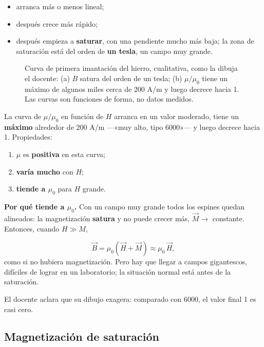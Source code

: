 \documentclass[12pt,a4paper]{article}
\begin{document}
\begin{itemize}
  \item arranca más o menos lineal;
  \item después crece más rápido;
  \item después empieza a \textbf{saturar}, con una pendiente mucho más baja; la zona de
  saturación está del orden de \textbf{un tesla}, un campo muy grande.
\end{itemize}

\begin{figure}[H]
  \centering
  
  \caption{Curva de primera imantación del hierro, cualitativa, como la dibuja el docente: (a) $B$ satura del orden de un tesla; (b) $\mu/\mu_0$ tiene un máximo de algunos miles cerca de 200 A/m y luego decrece hacia 1. Las curvas son funciones de forma, no datos medidos.}
\end{figure}

La curva de $\mu/\mu_0$ en función de $H$ arranca en un valor moderado, tiene un
\textbf{máximo} alrededor de 200 A/m ---«muy alto, tipo 6000»--- y luego decrece hacia
1. Propiedades:

\begin{enumerate}
  \item $\mu$ es \textbf{positiva} en esta curva;
  \item \textbf{varía mucho} con $H$;
  \item \textbf{tiende a $\mu_0$} para $H$ grande.
\end{enumerate}

\textbf{Por qué tiende a $\mu_0$.} Con un campo muy grande todos los espines quedan
alineados: la magnetización \textbf{satura} y no puede crecer más, $\vec M\to$
constante. Entonces, cuando $H\gg M$,

\[
\vec B = \mu_0(\vec H+\vec M)\approx\mu_0\,\vec H,
\]
como si no hubiera magnetización. Pero hay que llegar a campos gigantescos,
difíciles de lograr en un laboratorio; la situación normal está antes de la
saturación.

\begin{notebox}
El docente aclara que su dibujo exagera: comparado con 6000, el valor final
1 es casi cero.
\end{notebox}

\subsection{Magnetización de saturación}
\end{document}
